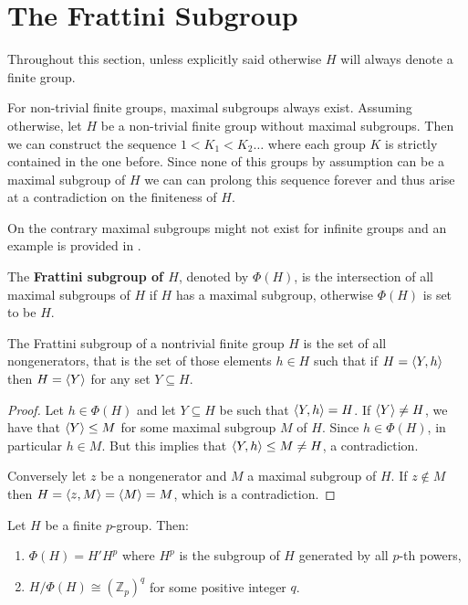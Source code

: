 \section{The Frattini Subgroup}

Throughout this section, unless explicitly said otherwise $H$ will always denote a finite group. 

For non-trivial finite groups, maximal subgroups always exist. Assuming otherwise, let $H$ be a non-trivial finite group without maximal subgroups. Then we can construct the sequence
$1 < K_1 < K_2 \ldots $
where each group $K$ is strictly contained in the one before. Since none of this groups by assumption can be a maximal subgroup of $H$ we can can prolong this sequence forever and thus arise at a contradiction on the finiteness of $H$.

On the contrary maximal subgroups might not exist for infinite groups and an example is provided in \cite[p.~123]{RotmanITG}.

\begin{definition}
    The \textbf{Frattini subgroup of $H$}, denoted by \textbf{$\Phi(H)$}, is the intersection of all maximal subgroups of $H$ if $H$ has a maximal subgroup, otherwise $\Phi(H)$ is set to be $H$. 
\end{definition}

\begin{theorem}
    \cite[Theorem 5.47]{RotmanITG}
    The Frattini subgroup of a nontrivial finite group $H$ is the set of all nongenerators, that is the set of those elements $h \in H$ such that if $H = \langle Y, h \rangle$ then $H = \langle Y \rangle$ for any set $Y \subseteq H$.
\end{theorem}

\begin{proof}
    Let $h \in \Phi(H)$ and let $Y \subseteq H$ be such that $\langle Y, h \rangle = H$. If $\langle Y \rangle \ne H$, we have that $\langle Y \rangle \le M$ for some maximal subgroup $M$ of $H$. Since $h \in \Phi(H)$, in particular $h \in M$.  But this implies that $\langle Y,h \rangle \le M \ne H$, a contradiction.

    Conversely let $z$ be a nongenerator and $M$ a maximal subgroup of $H$. If $z \notin M$ then $H = \langle z, M \rangle = \langle M \rangle = M$, which is a contradiction.
\end{proof}

\begin{theorem}
    \cite[Theorem 5.48]{RotmanITG}
    \label{fratpgroup}
    Let $H$ be a finite $p$-group. Then:
    \begin{enumerate}
        \item $\Phi(H) = H'H^p$ where $H^p$ is the subgroup of $H$ generated by all $p$-th powers,
        \item $H/\Phi(H) \cong (\mathbb{Z}_p)^q$ for some positive integer $q$.
    \end{enumerate}
\end{theorem}

